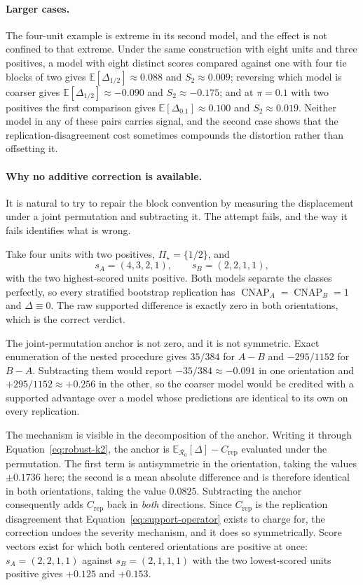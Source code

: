 \documentclass[11pt]{article}
\newcommand{\CNAP}{\operatorname{CNAP}}
\newcommand{\Regime}{\mathcal{R}}
\newcommand{\PSet}{\Pi_\star}
\newcommand{\E}{\mathbb{E}}
\theoremstyle{remark}
\begin{document}
\paragraph{Larger cases.}
The four-unit example is extreme in its second model, and the effect is not confined to that extreme. Under the same construction with eight units and three positives, a model with eight distinct scores compared against one with four tie blocks of two gives $\E[\Delta_{1/2}]\approx0.088$ and $S_2\approx0.009$; reversing which model is coarser gives $\E[\Delta_{1/2}]\approx-0.090$ and $S_2\approx-0.175$; and at $\pi=0.1$ with two positives the first comparison gives $\E[\Delta_{0.1}]\approx0.100$ and $S_2\approx0.019$. Neither model in any of these pairs carries signal, and the second case shows that the replication-disagreement cost sometimes compounds the distortion rather than offsetting it.


\paragraph{Why no additive correction is available.}
It is natural to try to repair the block convention by measuring the displacement under a joint permutation and subtracting it. The attempt fails, and the way it fails identifies what is wrong.

Take four units with two positives, $\PSet=\{1/2\}$, and
\[
s_A=(4,3,2,1),
\qquad
s_B=(2,2,1,1),
\]
with the two highest-scored units positive. Both models separate the classes perfectly, so every stratified bootstrap replication has $\CNAP_A=\CNAP_B=1$ and $\Delta\equiv0$. The raw supported difference is exactly zero in both orientations, which is the correct verdict.

The joint-permutation anchor is not zero, and it is not symmetric. Exact enumeration of the nested procedure gives $35/384$ for $A-B$ and $-295/1152$ for $B-A$. Subtracting them would report $-35/384\approx-0.091$ in one orientation and $+295/1152\approx+0.256$ in the other, so the coarser model would be credited with a supported advantage over a model whose predictions are identical to its own on every replication.

The mechanism is visible in the decomposition of the anchor. Writing it through Equation~\eqref{eq:robust-k2}, the anchor is $\E_{\Regime_0}[\Delta]-C_{\mathrm{rep}}$ evaluated under the permutation. The first term is antisymmetric in the orientation, taking the values $\pm0.1736$ here; the second is a mean absolute difference and is therefore identical in both orientations, taking the value $0.0825$. Subtracting the anchor consequently adds $C_{\mathrm{rep}}$ back in \emph{both} directions. Since $C_{\mathrm{rep}}$ is the replication disagreement that Equation~\eqref{eq:support-operator} exists to charge for, the correction undoes the severity mechanism, and it does so symmetrically. Score vectors exist for which both centered orientations are positive at once: $s_A=(2,2,1,1)$ against $s_B=(2,1,1,1)$ with the two lowest-scored units positive gives $+0.125$ and $+0.153$.
\end{document}
